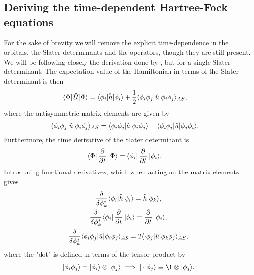     \subsection{Deriving the time-dependent Hartree-Fock equations}
        For the sake of brevity we will remove the explicit time-dependence in
        the orbitals, the Slater determinants and the operators, though they are
        still present. We will be following closely the derivation done by
        \citeauthor{hochstuhl2014time}, but for a single Slater determinant. The
        expectation value of the Hamiltonian in terms of the Slater determinant
        is then
        \begin{align}
            \langle \Phi |\hat{H}| \Phi \rangle
            &= \langle \phi_i |\hat{h}| \phi_i \rangle
            + \frac{1}{2}\langle \phi_i\phi_j |\hat{u}| \phi_i\phi_j \rangle_{AS},
        \end{align}
        where the antisymmetric matrix elements are given by
        \begin{align}
            \langle \phi_i\phi_j |\hat{u}| \phi_i\phi_j \rangle_{AS}
            &= \langle \phi_i\phi_j |\hat{u}| \phi_i\phi_j \rangle
            - \langle \phi_i\phi_j |\hat{u}| \phi_j\phi_i \rangle.
            \label{eq:antisymmetric_two_body}
        \end{align}
        Furthermore, the time derivative of the Slater determinant is
        \begin{align}
            \bra{\Phi}\dpd{}{t}\ket{\Phi}
            &= \bra{\phi_i}\dpd{}{t}\ket{\phi_i}.
        \end{align}
        Introducing functional derivatives, which when acting on the matrix
        elements gives
        \begin{gather}
            \dfd{\phi_k^{*}}\bra{\phi_i}\hat{h}\ket{\phi_i}
            = \hat{h}\ket{\phi_k}, \\
            \dfd{\phi_k^{*}}\bra{\phi_i}\dpd{}{t}\ket{\phi_i}
            = \dpd{}{t}\ket{\phi_i}, \\
            \dfd{\phi_k^{*}}\bra{\phi_i\phi_j}\hat{u}\ket{\phi_i\phi_j}_{AS}
            = 2\bra{\cdot\phi_j}\hat{u}\ket{\phi_k\phi_j}_{AS},
        \end{gather}
        where the "dot" is defined in terms of the tensor product by
        \begin{align}
            \ket{\phi_i\phi_j} = \ket{\phi_i}\otimes\ket{\phi_j}
            \implies \ket{\cdot\phi_j} \equiv \1 \otimes\ket{\phi_j}.
        \end{align}
